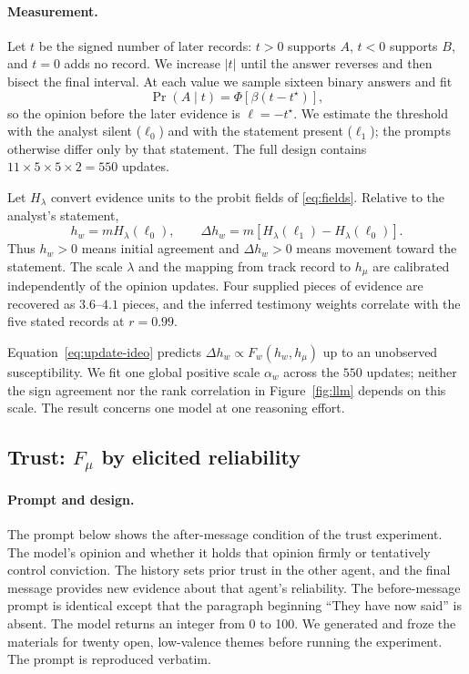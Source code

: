\documentclass{article}
\newcommand{\hw}{h_{w}}
\newcommand{\hmu}{h_{\mu}}
\newcommand{\Fw}{F_{w}}
\newcommand{\Fmu}{F_{\mu}}
\begin{document}
\paragraph{Measurement.} Let $t$ be the signed number of later records: $t>0$
supports $A$, $t<0$ supports $B$, and $t=0$ adds no record. We increase $|t|$
until the answer reverses and then bisect the final interval. At each value we
sample sixteen binary answers and fit
%
\begin{equation}
  \Pr(A\mid t)=\Phi\!\left[\beta(t-t^\star)\right],
  \label{eq:nulling-probit}
\end{equation}
%
so the opinion before the later evidence is $\ell=-t^\star$. We estimate the
threshold with the analyst silent ($\ell_0$) and with the statement present
($\ell_1$); the prompts otherwise differ only by that statement. The full design
contains $11\times5\times5\times2=550$ updates.

Let $H_\lambda$ convert evidence units to the probit fields of
\eqref{eq:fields}. Relative to the analyst's statement,
%
\begin{equation}
  \hw=mH_\lambda(\ell_0),
  \qquad
  \Delta\hw=m\left[H_\lambda(\ell_1)-H_\lambda(\ell_0)\right].
  \label{eq:nulling-map}
\end{equation}
%
Thus $\hw>0$ means initial agreement and $\Delta\hw>0$ means movement toward the
statement. The scale $\lambda$ and the mapping from track record to $\hmu$ are
calibrated independently of the opinion updates. Four supplied pieces of evidence
are recovered as $3.6$--$4.1$ pieces, and the inferred testimony weights correlate
with the five stated records at $r=0.99$.

Equation~\eqref{eq:update-ideo} predicts
$\Delta\hw\propto\Fw(\hw,\hmu)$ up to an unobserved susceptibility. We fit one
global positive scale $\alpha_w$ across the $550$ updates; neither the sign
agreement nor the rank correlation in Figure~\ref{fig:llm} depends on this scale.
The result concerns one model at one reasoning effort.

\subsection{Trust: \texorpdfstring{$\Fmu$}{Fmu} by elicited reliability}
\label{app:llm-trust}

\paragraph{Prompt and design.} The prompt below shows the after-message condition
of the trust experiment. The model's opinion and whether it holds that opinion
firmly or tentatively control conviction. The history sets prior trust in the
other agent, and the final message provides new evidence about that agent's
reliability. The before-message prompt is identical except that the paragraph
beginning ``They have now said'' is absent. The model returns an integer from 0
to 100. We generated and froze the materials for twenty open, low-valence themes
before running the experiment. The prompt is reproduced verbatim.
\end{document}
